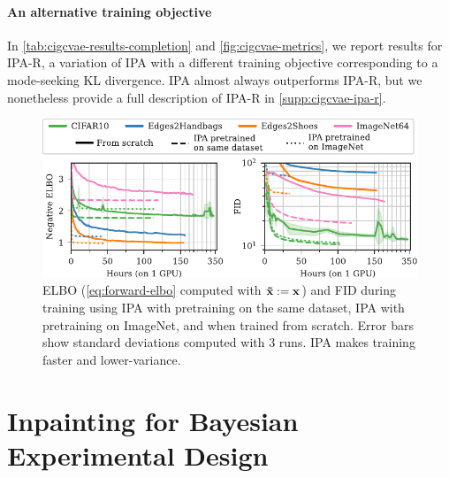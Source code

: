 \paragraph{An alternative training objective}
In \cref{tab:cigcvae-results-completion} and \cref{fig:cigcvae-metrics}, we report results for
IPA-R, a variation of IPA with a different training objective corresponding to a
mode-seeking KL divergence. IPA almost always outperforms IPA-R, but we
nonetheless provide a full description of IPA-R in \cref{supp:cigcvae-ipa-r}.

\begin{figure}[t]
  \vspace{-.1cm}
  \centering
  \includegraphics[scale=1]{figs/cigcvae/training-both}
  \caption{ELBO (\cref{eq:forward-elbo} computed with $\mathbf{\tilde{x}}{} := {\mathbf{x}}$) and
    FID during training using IPA with pretraining on the same dataset, IPA with
    pretraining on ImageNet, and when trained from scratch. Error bars show
    standard deviations computed with 3 runs. IPA makes training faster and
    lower-variance.}
  \label{fig:cigcvae-training}
  \vspace{-.3cm}
\end{figure}




\section{Inpainting for Bayesian Experimental Design} \label{sec:cigcvae-boed}


